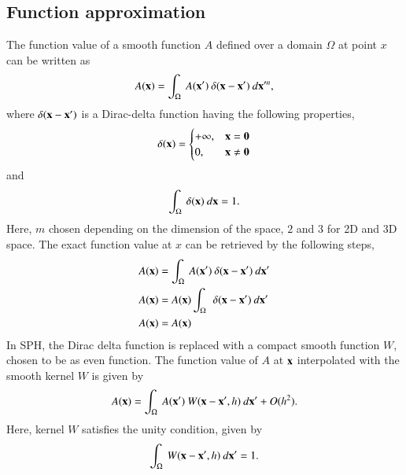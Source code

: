 \subsection{Function approximation}
The function value of a smooth function $A$ defined over a domain $\Omega$ at
point $x$ can be written as
\begin{equation}
  \label{eq:dirac_repr}
  A(\mathbf{x}) = \int_{\Omega}\> A(\mathbf{x}') \> \delta(\mathbf{x} - \mathbf{x}') \> d\mathbf{x}'^{n},
\end{equation}
where $\delta(\mathbf{x} - \mathbf{x}')$ is a Dirac-delta function having the
following properties,
\begin{equation}
  \label{eq:dirac-delta}
  \delta(\mathbf{x}) =
  \begin{cases}
    +\infty, & \mathbf{x} = \mathbf{0}\\
    0, & \mathbf{x} \neq \mathbf{0}
  \end{cases}
\end{equation}
and
\begin{equation}
  \label{eq:unity}
  \int_{\Omega}\> \delta(\mathbf{x}) \> d\mathbf{x} = 1.
\end{equation}
Here, $m$ chosen depending on the dimension of the space, $2$ and $3$ for 2D and 3D space.
The exact function value at $x$ can be retrieved by the following steps,
\begin{align*}
  \label{eq:dirac_derivation}
  A(\mathbf{x}) &= \int_{\Omega}\> A(\mathbf{x}') \> \delta(\mathbf{x} - \mathbf{x}') \> d\mathbf{x}'\\
  A(\mathbf{x}) &= A(\mathbf{x}) \int_{\Omega}\> \> \delta(\mathbf{x} - \mathbf{x}') \> d\mathbf{x}'\\
  A(\mathbf{x}) &= A(\mathbf{x})
\end{align*}
In SPH, the Dirac delta function is replaced with a compact smooth function $W$,
chosen to be as even function. The function value of $A$ at $\mathbf{x}$
interpolated with the smooth kernel $W$ is given by
\begin{equation}
  \label{eq:kernel_repr}
  A(\mathbf{x}) = \int_{\Omega}\> A(\mathbf{x}') \> W(\mathbf{x} - \mathbf{x}', h)  \> d\mathbf{x}' + O(h^2).
\end{equation}
Here, kernel $W$ satisfies the unity condition, given by
\begin{equation}
  \label{eq:unity}
  \int_{\Omega}\> W(\mathbf{x} - \mathbf{x}', h)  \> d\mathbf{x}' = 1.
\end{equation}

